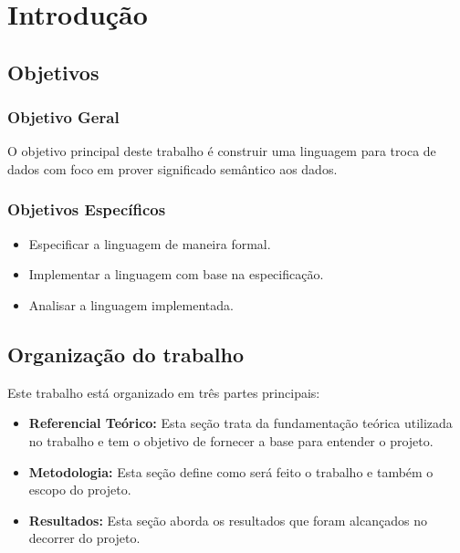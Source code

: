 \chapter[Introdução]{Introdução}

\section{Objetivos}
\label{sec:objective}

\subsection{Objetivo Geral}

O objetivo principal deste trabalho é construir uma linguagem para troca de dados
com foco em prover significado semântico aos dados.

\subsection{Objetivos Específicos}

\begin{itemize}
    \item Especificar a linguagem de maneira formal.
    \item Implementar a linguagem com base na especificação.
    \item Analisar a linguagem implementada.
\end{itemize}

\section{Organização do trabalho}

Este trabalho está organizado em três partes principais:

\begin{itemize}
    \item \textbf{Referencial Teórico:} Esta seção trata da fundamentação teórica
    utilizada no trabalho e tem o objetivo de fornecer a base para entender o projeto.
    \item \textbf{Metodologia:} Esta seção define como será feito o trabalho e também
    o escopo do projeto.
    \item \textbf{Resultados:} Esta seção aborda os resultados que foram alcançados no decorrer
    do projeto.
\end{itemize}